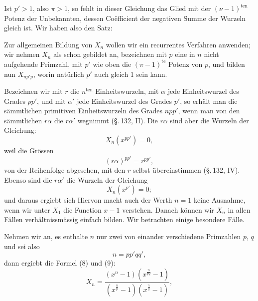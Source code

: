Ist $p' > 1$, also $\pi > 1$, so fehlt in dieser Gleichung das
Glied mit der $(\nu-1)^{\text{ten}}$ Potenz der Unbekannten, dessen Co\"efficient der negativen Summe der Wurzeln gleich ist. Wir haben
also den Satz:


Zur allgemeinen Bildung von $X_n$ wollen wir ein recurrentes
Verfahren anwenden; wir nehmen $X_n$ als schon gebildet an,
bezeichnen mit $p$ eine in $n$ nicht aufgehende Primzahl, mit $p'$
wie oben die $(\pi-1)^{\text{te}}$ Potenz von $p$, und bilden nun $X_{np'p}$,
worin nat\"urlich $p'$ auch gleich 1 sein kann.

Bezeichnen wir mit $r$ die  $n^{\text{ten}}$ Einheitswurzeln,
mit $\alpha$ jede Einheitswurzel des Grades $pp'$, und mit $\alpha'$ jede Einheitswurzel des Grades $p'$, so erh\"alt man die s\"ammtlichen primitiven Einheitswurzeln des Grades $npp'$, wenn man von den
s\"ammtlichen $r\alpha$ die $r\alpha'$ wegnimmt (\S.\,132, II). Die $r\alpha$ sind aber
die Wurzeln der Gleichung:
\[
X_n(x^{pp'}) = 0,
\]
weil die Gr\"ossen
\[
(r\alpha)^{pp'} = r^{pp'},
\]
von der Reihenfolge abgesehen, mit den $r$ selbst \"ubereinstimmen
(\S.\,132, IV). Ebenso sind die $r\alpha'$ die Wurzeln der Gleichung
\[
X_n(x^{p'}) = 0;
\]
und daraus ergiebt sich
Hiervon macht auch der Werth $n=1$ keine Ausnahme,
wenn wir unter $X_1$ die Function $x-1$ verstehen. Danach
k\"onnen wir $X_n$ in allen F\"allen verh\"altnissm\"assig einfach bilden.
Wir betrachten einige besondere F\"alle.

Nehmen wir an, es enthalte $n$ nur zwei von einander verschiedene Primzahlen $p$, $q$ und sei also
\[
n = pp'qq',
\]
dann ergiebt die Formel (8) und (9):
\[
X_n = \frac{(x^n-1)\left(x^{\frac{n}{pq}}-1\right)}{\left(x^{\frac{n}{p}}-1\right)\left(x^{\frac{n}{q}}-1\right)},
\]
